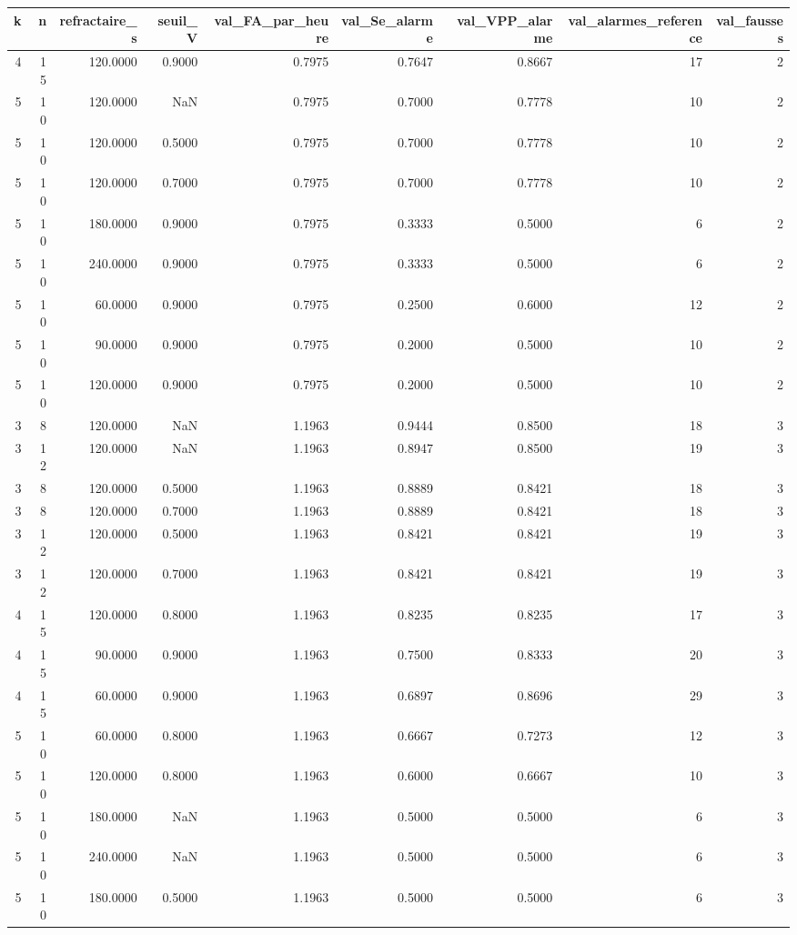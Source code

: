 \begin{tabular}{rrrrrrrrr}
\toprule
k & n & refractaire_s & seuil_V & val_FA_par_heure & val_Se_alarme & val_VPP_alarme & val_alarmes_reference & val_fausses \\
\midrule
4 & 15 & 120.0000 & 0.9000 & 0.7975 & 0.7647 & 0.8667 & 17 & 2 \\
5 & 10 & 120.0000 & NaN & 0.7975 & 0.7000 & 0.7778 & 10 & 2 \\
5 & 10 & 120.0000 & 0.5000 & 0.7975 & 0.7000 & 0.7778 & 10 & 2 \\
5 & 10 & 120.0000 & 0.7000 & 0.7975 & 0.7000 & 0.7778 & 10 & 2 \\
5 & 10 & 180.0000 & 0.9000 & 0.7975 & 0.3333 & 0.5000 & 6 & 2 \\
5 & 10 & 240.0000 & 0.9000 & 0.7975 & 0.3333 & 0.5000 & 6 & 2 \\
5 & 10 & 60.0000 & 0.9000 & 0.7975 & 0.2500 & 0.6000 & 12 & 2 \\
5 & 10 & 90.0000 & 0.9000 & 0.7975 & 0.2000 & 0.5000 & 10 & 2 \\
5 & 10 & 120.0000 & 0.9000 & 0.7975 & 0.2000 & 0.5000 & 10 & 2 \\
3 & 8 & 120.0000 & NaN & 1.1963 & 0.9444 & 0.8500 & 18 & 3 \\
3 & 12 & 120.0000 & NaN & 1.1963 & 0.8947 & 0.8500 & 19 & 3 \\
3 & 8 & 120.0000 & 0.5000 & 1.1963 & 0.8889 & 0.8421 & 18 & 3 \\
3 & 8 & 120.0000 & 0.7000 & 1.1963 & 0.8889 & 0.8421 & 18 & 3 \\
3 & 12 & 120.0000 & 0.5000 & 1.1963 & 0.8421 & 0.8421 & 19 & 3 \\
3 & 12 & 120.0000 & 0.7000 & 1.1963 & 0.8421 & 0.8421 & 19 & 3 \\
4 & 15 & 120.0000 & 0.8000 & 1.1963 & 0.8235 & 0.8235 & 17 & 3 \\
4 & 15 & 90.0000 & 0.9000 & 1.1963 & 0.7500 & 0.8333 & 20 & 3 \\
4 & 15 & 60.0000 & 0.9000 & 1.1963 & 0.6897 & 0.8696 & 29 & 3 \\
5 & 10 & 60.0000 & 0.8000 & 1.1963 & 0.6667 & 0.7273 & 12 & 3 \\
5 & 10 & 120.0000 & 0.8000 & 1.1963 & 0.6000 & 0.6667 & 10 & 3 \\
5 & 10 & 180.0000 & NaN & 1.1963 & 0.5000 & 0.5000 & 6 & 3 \\
5 & 10 & 240.0000 & NaN & 1.1963 & 0.5000 & 0.5000 & 6 & 3 \\
5 & 10 & 180.0000 & 0.5000 & 1.1963 & 0.5000 & 0.5000 & 6 & 3 \\

\end{tabular}

